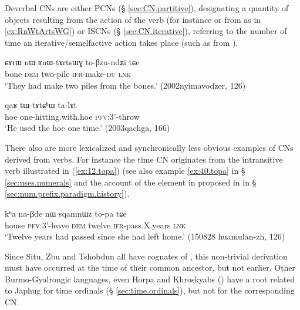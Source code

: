 Deverbal CNs are either PCNs (§ \ref{sec:CN.partitive}), designating a quantity of objects resulting from the action of the verb (for instance  or  from  as in \ref{ex:RnWtArtsWG}) or ISCNs (§ \ref{sec:CN.iterative}), referring to the number of time an iterative/semelfactive action takes place (such as  from ).

\begin{exe}
\ex \label{ex:RnWtArtsWG}
\gll ɕɤrɯ nɯ ʁnɯ-tɤrtsɯɣ to-βzu-ndʑi tɕe \\
bone \textsc{dem} two-pile \textsc{ifr}-make-\textsc{du} \textsc{lnk} \\
\glt `They had make two piles from the bones.' (2002nyimavodzer, 126)
\end{exe}

\begin{exe}
\ex \label{ex:tWtAtChW}
\gll qaʁ tɯ-tɤtɕʰɯ ta-lɤt  \\
hoe one-hitting.with.hoe \textsc{pfv}:3'-throw \\
\glt `He used the hoe one time.' (2003qachga, 166)
\end{exe}

There also are more lexicalized and synchronically less obvious examples of CNs derived from verbs. For instance the time CN  originates from the intransitive verb   illustrated in (\ref{ex:12.topa}) (see also example \ref{ex:40.topa}  in § \ref {sec:uses.numerals} and the account of the  element in  proposed in in § \ref{sec:num.prefix.paradigm.history}). 

\begin{exe}
\ex \label{ex:12.topa} 
\gll kʰa na-βde nɯ sqamnɯz to-pa tɕe \\ 
house \textsc{pfv}:3'-leave \textsc{dem} twelve  \textsc{ifr}-pass.X.years \textsc{lnk} \\
\glt `Twelve years had passed since she had left home.' (150828 huamulan-zh, 126)
\end{exe}

Since Situ, Zbu and Tshobdun all have cognates of , this non-trivial derivation must have occurred at the time of their common ancestor, but not earlier. Other Burmo-Gyalrongic languages, even Horpa and Khroskyabs (\citealt{jacques17stau}) have a root related to Japhug  for time ordinals (§ \ref{sec:time.ordinals}), but not for the corresponding CN. 
 
